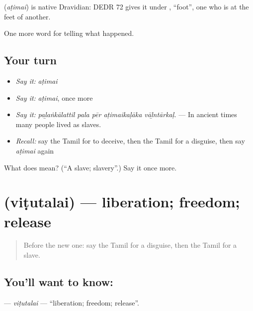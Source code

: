 \begin{cousinweb}
\textbf{} (\emph{aṭimai}) is native Dravidian: DEDR 72 gives it under , \textquotedblleft{}foot\textquotedblright{}, one who is at the feet of another.
\end{cousinweb}

\begin{grammarlens}[title={What you've built}]
One more word for telling what happened.
\end{grammarlens}

\subsection*{Your turn}
\begin{itemize}
\raggedright
  \item \emph{Say it:} \emph{aṭimai}
  \item \emph{Say it:} \emph{aṭimai}, once more
  \item \emph{Say it:} \emph{paḻaṅkālattil pala pēr aṭimaikaḷāka vāḻntārkaḷ.} — In ancient times many people lived as slaves.
  \item \emph{Recall:} say the Tamil for to deceive, then the Tamil for a disguise, then say \emph{aṭimai} again
\end{itemize}

\begin{tcolorbox}[breakable,colback=teal!4,colframe=teal!35!black,title={Before you move on}]
What does  mean? (\textquotedblleft{}A slave; slavery\textquotedblright{}.) Say it once more.
\end{tcolorbox}
\section[\texorpdfstring{\ta{விடுதலை} (viṭutalai)}{விடுதலை (viṭutalai)}]{ (viṭutalai) — liberation; freedom; release}

\label{lesson:TA-C338-vitutalai}



\begin{quote}
Before the new one: say the Tamil for a disguise, then the Tamil for a slave.
\end{quote}

\subsection*{You'll want to know: }
\textbf{} — \emph{viṭutalai} — \textquotedblleft{}liberation; freedom; release\textquotedblright{}.

